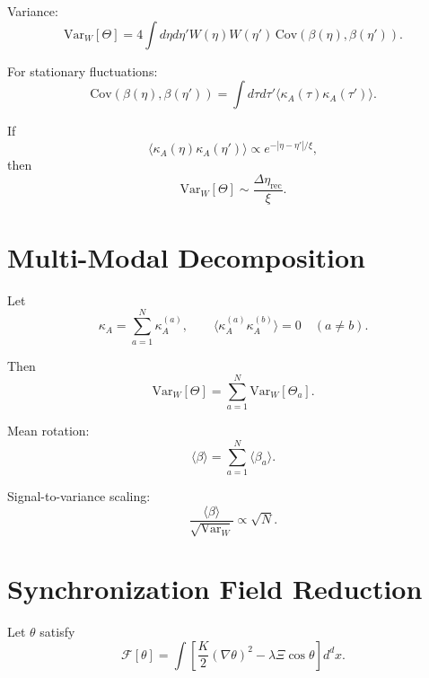 \documentclass[12pt]{article}
\begin{document}
Variance:
\begin{equation}
\mathrm{Var}_W[\Theta]
=
4
\int d\eta d\eta'
W(\eta)W(\eta')
\,
\mathrm{Cov}\!\left(
\beta(\eta),\beta(\eta')
\right).
\end{equation}

For stationary fluctuations:
\begin{equation}
\mathrm{Cov}(\beta(\eta),\beta(\eta'))
=
\int d\tau d\tau'
\langle
\kappa_A(\tau)\kappa_A(\tau')
\rangle.
\end{equation}

If
\begin{equation}
\langle
\kappa_A(\eta)\kappa_A(\eta')
\rangle
\propto
e^{-|\eta-\eta'|/\xi},
\end{equation}
then
\begin{equation}
\mathrm{Var}_W[\Theta]
\sim
\frac{\Delta\eta_{\mathrm{rec}}}{\xi}.
\end{equation}

\section{Multi-Modal Decomposition}

Let
\begin{equation}
\kappa_A
=
\sum_{a=1}^{N}
\kappa_A^{(a)},
\qquad
\langle \kappa_A^{(a)} \kappa_A^{(b)} \rangle
=
0
\quad (a\neq b).
\end{equation}

Then
\begin{equation}
\mathrm{Var}_W[\Theta]
=
\sum_{a=1}^{N}
\mathrm{Var}_W[\Theta_a].
\end{equation}

Mean rotation:
\begin{equation}
\langle \beta \rangle
=
\sum_{a=1}^{N}
\langle \beta_a \rangle.
\end{equation}

Signal-to-variance scaling:
\begin{equation}
\frac{\langle \beta \rangle}{\sqrt{\mathrm{Var}_W}}
\propto
\sqrt{N}.
\end{equation}

\section{Synchronization Field Reduction}

Let $\theta$ satisfy
\begin{equation}
\mathcal{F}[\theta]
=
\int
\left[
\frac{K}{2}(\nabla\theta)^2
-
\lambda \Xi \cos\theta
\right] d^dx.
\end{equation}
\end{document}

